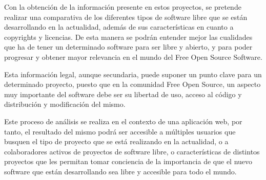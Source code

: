 \documentclass[a4paper, spanish, 12pt]{book}
\begin{document}
Con la obtenci\'on de la informaci\'on presente en estos proyectos, se pretende
realizar una comparativa de los diferentes tipos de software libre que se est\'an
desarrollando en la actualidad, adem\'as de sus caracter\'isticas en cuanto a
copyrights y licencias. De esta manera se podr\'an entender mejor las cualidades
que ha de tener un determinado software para ser libre y abierto, y para poder
progresar y obtener mayor relevancia en el mundo del Free Open Source Software.

Esta informaci\'on legal, aunque secundaria, puede suponer un punto clave para
un determinado proyecto, puesto que en la comunidad Free Open Source, un aspecto
muy importante del software debe ser su libertad de uso, acceso al c\'odigo y distribuci\'on
y modificaci\'on del mismo.

Este proceso de an\'alisis se realiza en el contexto de una aplicaci\'on
web, por tanto, el resultado del mismo podr\'a ser accesible a m\'ultiples usuarios
que busquen el tipo de proyecto que se est\'a realizando en la actualidad, o a
colaboradores activos de proyectos de software libre, o caracter\'isticas de distintos
proyectos que les permitan tomar conciencia de la importancia de que el nuevo software
que est\'an desarrollando sea libre y accesible para todo el mundo.

%
%
%
%
%
%
%
\end{document}
